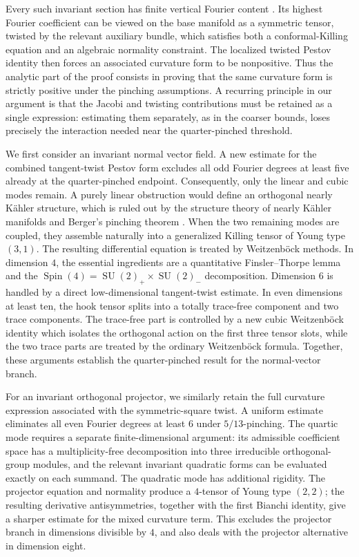 \documentclass[reqno,11pt]{amsart}
\theoremstyle{definition}
\newcommand{\Spin}{\operatorname{Spin}}
\newcommand{\SU}{\operatorname{SU}}
\begin{document}
Every such invariant section has finite vertical Fourier content
\cite{GPSU16}.  Its highest Fourier coefficient can be viewed on the
base manifold as a symmetric tensor, twisted by the relevant auxiliary
bundle, which satisfies both a conformal-Killing equation and an
algebraic normality constraint.  The localized twisted Pestov identity
then forces an associated curvature form to be nonpositive.  Thus the
analytic part of the proof consists in proving that the same curvature
form is strictly positive under the pinching assumptions.  A recurring
principle in our argument is that the Jacobi and twisting contributions
must be retained as a single expression: estimating them separately,
as in the coarser bounds, loses precisely the interaction needed near
the quarter-pinched threshold.

We first consider an invariant normal vector field.  A new estimate for
the combined tangent-twist Pestov form excludes all odd Fourier degrees
at least five already at the quarter-pinched endpoint.  Consequently,
only the linear and cubic modes remain.  A purely linear obstruction
would define an orthogonal nearly K\"ahler structure, which is ruled out
by the structure theory of nearly K\"ahler manifolds and Berger's
pinching theorem
\cite{Gray76,Nagy02,Berger60}.  When the two remaining modes are
coupled, they assemble naturally into a generalized Killing tensor of
Young type \((3,1)\).  The resulting differential equation is treated
by Weitzenb\"ock methods.  In dimension $4$, the essential ingredients
are a quantitative Finsler--Thorpe lemma and the
\(\Spin(4)=\SU(2)_+\times\SU(2)_-\) decomposition.  Dimension $6$ is
handled by a direct low-dimensional tangent-twist estimate.  In even
dimensions at least ten, the hook tensor splits into a totally
trace-free component and two trace components.  The trace-free part is
controlled by a new cubic Weitzenb\"ock identity which isolates the
orthogonal action on the first three tensor slots, while the two trace
parts are treated by the ordinary Weitzenb\"ock formula.  Together,
these arguments establish the quarter-pinched result for the
normal-vector branch.

For an invariant orthogonal projector, we similarly retain the full
curvature expression associated with the symmetric-square twist.  A
uniform estimate eliminates all even Fourier degrees at least $6$
under \(5/13\)-pinching.  The quartic mode requires a separate
finite-dimensional argument: its admissible coefficient space has a
multiplicity-free decomposition into three irreducible orthogonal-group
modules, and the relevant invariant quadratic forms can be evaluated
exactly on each summand.  The quadratic mode has additional rigidity.
The projector equation and normality produce a $4$-tensor of Young
type \((2,2)\); the resulting derivative antisymmetries, together with
the first Bianchi identity, give a sharper estimate for the mixed
curvature term.  This excludes the projector branch in dimensions
divisible by $4$, and also deals with the projector alternative in
dimension eight.
\end{document}
